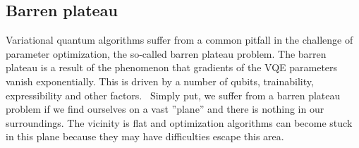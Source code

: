 \subsection{Barren plateau}
Variational quantum algorithms suffer from a common pitfall in the challenge of parameter optimization, the so-called barren plateau problem. The barren plateau is a result of the phenomenon that gradients of the VQE parameters vanish exponentially. This is driven by a number of qubits, trainability, expressibility and other factors.~\cite{fedorov2021vqe} Simply put, we suffer from a barren plateau problem if we find ourselves on a vast ''plane'' and there is nothing in our surroundings. The vicinity is flat and optimization algorithms can become stuck in this plane because they may have difficulties escape this area.
